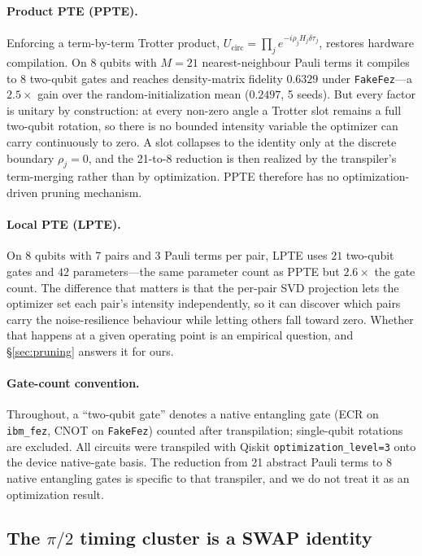 \documentclass[twocolumn,aps,prl,superscriptaddress,showkeys]{revtex4-2}
\theoremstyle{plain}
\theoremstyle{definition}
\newcommand{\ibmfez}{\texttt{ibm\_fez}}
\newcommand{\fakefez}{\texttt{FakeFez}}
\begin{document}
\paragraph{Product PTE (PPTE).}
Enforcing a term-by-term Trotter product, $U_{\mathrm{circ}}=\prod_j e^{-i\rho_j H_j\delta\tau_j}$, restores hardware compilation. On 8 qubits with $M=21$ nearest-neighbour Pauli terms it compiles to 8 two-qubit gates and reaches density-matrix fidelity $0.6329$ under \fakefez---a $2.5\times$ gain over the random-initialization mean ($0.2497$, 5 seeds). But every factor is unitary by construction: at every non-zero angle a Trotter slot remains a full two-qubit rotation, so there is no bounded intensity variable the optimizer can carry continuously to zero. A slot collapses to the identity only at the discrete boundary $\rho_j=0$, and the 21-to-8 reduction is then realized by the transpiler's term-merging rather than by optimization. PPTE therefore has no optimization-driven pruning mechanism.

\paragraph{Local PTE (LPTE).}
On 8 qubits with 7 pairs and 3 Pauli terms per pair, LPTE uses $21$ two-qubit gates and $42$ parameters---the same parameter count as PPTE but $2.6\times$ the gate count. The difference that matters is that the per-pair SVD projection lets the optimizer set each pair's intensity independently, so it can discover which pairs carry the noise-resilience behaviour while letting others fall toward zero. Whether that happens at a given operating point is an empirical question, and \S\ref{sec:pruning} answers it for ours.

\paragraph{Gate-count convention.}
Throughout, a ``two-qubit gate'' denotes a native entangling gate (ECR on \ibmfez, CNOT on \fakefez) counted after transpilation; single-qubit rotations are excluded. All circuits were transpiled with Qiskit \texttt{optimization\_level=3} onto the device native-gate basis. The reduction from 21 abstract Pauli terms to 8 native entangling gates is specific to that transpiler, and we do not treat it as an optimization result.

\subsection{The \texorpdfstring{$\pi/2$}{pi/2} timing cluster is a SWAP identity}
\end{document}
